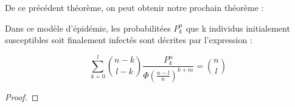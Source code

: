 De ce précédent théorème, on peut obtenir notre prochain théorème :
\begin{theorem}
Dans ce modèle d'épidémie, les probabilitées $P_{k}^{n}$ que k individus initialement susceptibles soit finalement infectés sont décrites par l'expression :

$$\sum_{k=0}^{l}\binom{n-k}{l-k}\frac{P_{k}^{n}}{\Phi( \frac{n-l}{n})^{k + m} }=\binom{n}{l}$$
\end{theorem}

\begin{proof}


\end{proof}


